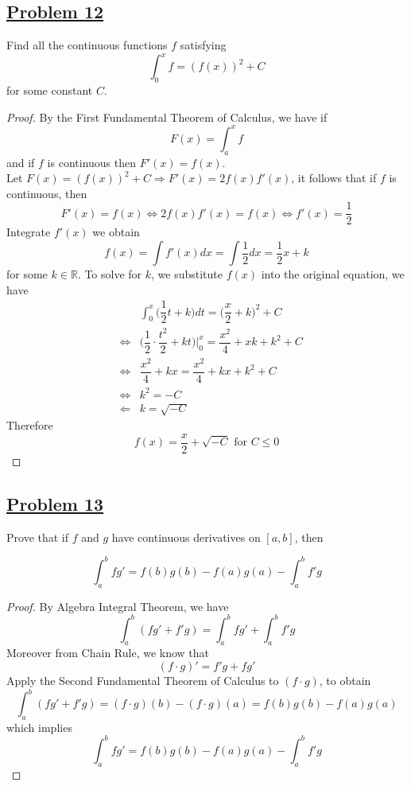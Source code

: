 \documentclass[10pt,letterpaper]{article}
\begin{document}
	
	\subsection*{{\color{purple}\underline{Problem 12}}}
	Find all the continuous functions $f$ satisfying 
	$$\displaystyle\int_0^x f = (f(x))^2 + C$$
	for some constant $C$.
\begin{proof}
	By the First Fundamental Theorem of Calculus, we have if 
	$$F(x) = \int_a^x f$$
	and if $f$ is continuous then $F'(x) = f(x)$. \\
	Let $F(x) = (f(x))^2 + C \Rightarrow F'(x) = 2f(x)f'(x)$, it follows that
	if $f$ is continuous, then
	$$F'(x) = f(x) \Leftrightarrow 2f(x)f'(x) = f(x) \Leftrightarrow f'(x) = \dfrac{1}{2}$$
	Integrate $f'(x)$ we obtain
	$$f(x) = \int f'(x) dx = \int \dfrac{1}{2} dx = \dfrac{1}{2}x + k$$ 
	for some $k \in \mathbb{R}$. To solve for $k$, we substitute $f(x)$ into the original 
	equation, we have
\begin{eqnarray*}
	& & \int_0^x \bigg(\dfrac{1}{2}t + k \bigg) dt = \bigg(\dfrac{x}{2} + k\bigg)^2 + C \\
	& \Leftrightarrow & \bigg(\dfrac{1}{2} \cdot \dfrac{t^2}{2} + kt \bigg)\bigg|_0^x = \dfrac{x^2}{4} + 
	xk + k^2 + C\\
	& \Leftrightarrow & \dfrac{x^2}{4} + kx = \dfrac{x^2}{4} + kx + k^2 + C \\
	& \Leftrightarrow & k^2 = -C \\
	& \Leftarrow & k = \sqrt{-C}
\end{eqnarray*}
	Therefore
	$$f(x) = \dfrac{x}{2} + \sqrt{-C} \text{ for } C \leq 0 $$
	
	

\end{proof}	
	
	
	
	
	\subsection*{{\color{purple}\underline{Problem 13}}}
	Prove that if $f$ and $g$ have continuous derivatives on $[a, b]$, then
	
$$\displaystyle\int_a^b fg' 
= f(b)g(b) - f(a)g(a) - \displaystyle\int_a^b f'g$$
\begin{proof}
	By Algebra Integral Theorem, 
	we have 
	$$\int_a^b (fg' + f'g) = \int_a^b fg' + \int_a^b f'g$$
	Moreover from Chain Rule, we know that 
		$$(f \cdot g)' = f'g + fg'$$
	Apply the Second Fundamental Theorem of Calculus to $(f \cdot g)$, to obtain
	$$\int_a^b (fg' + f'g) = (f \cdot g)(b) - (f \cdot g)(a)
	= f(b)g(b) - f(a)g(a)$$
	which implies
	$$\displaystyle\int_a^b fg' 
= f(b)g(b) - f(a)g(a) - \displaystyle\int_a^b f'g$$


\end{proof}
	
\end{document}
